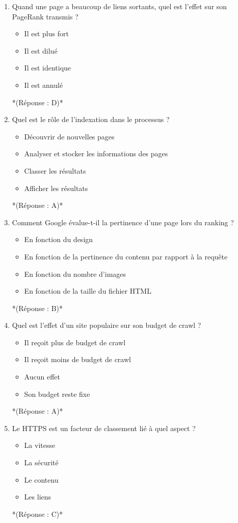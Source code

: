 \documentclass[12pt,a4paper,twoside]{report}
\begin{document}
\begin{enumerate}
\item Quand une page a beaucoup de liens sortants, quel est l'effet sur son PageRank transmis ?
\begin{itemize}
\item[A)] Il est plus fort
\item[B)] Il est dilué
\item[C)] Il est identique
\item[D)] Il est annulé
\end{itemize}
*(Réponse : D)*

\item Quel est le rôle de l'indexation dans le processus ?
\begin{itemize}
\item[A)] Découvrir de nouvelles pages
\item[B)] Analyser et stocker les informations des pages
\item[C)] Classer les résultats
\item[D)] Afficher les résultats
\end{itemize}
*(Réponse : A)*

\item Comment Google évalue-t-il la pertinence d'une page lors du ranking ?
\begin{itemize}
\item[A)] En fonction du design
\item[B)] En fonction de la pertinence du contenu par rapport à la requête
\item[C)] En fonction du nombre d'images
\item[D)] En fonction de la taille du fichier HTML
\end{itemize}
*(Réponse : B)*

\item Quel est l'effet d'un site populaire sur son budget de crawl ?
\begin{itemize}
\item[A)] Il reçoit plus de budget de crawl
\item[B)] Il reçoit moins de budget de crawl
\item[C)] Aucun effet
\item[D)] Son budget reste fixe
\end{itemize}
*(Réponse : A)*

\item Le HTTPS est un facteur de classement lié à quel aspect ?
\begin{itemize}
\item[A)] La vitesse
\item[B)] La sécurité
\item[C)] Le contenu
\item[D)] Les liens
\end{itemize}
*(Réponse : C)*


\end{enumerate}
\end{document}
